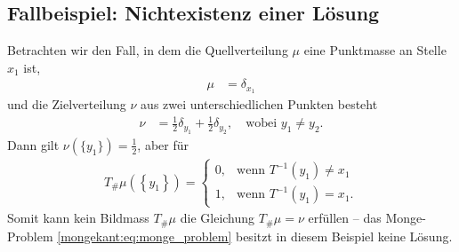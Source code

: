 \subsection{Fallbeispiel: Nichtexistenz einer Lösung%
\label{mongekant:subsection:monge_inexistence}}
Betrachten wir den Fall,
in dem die Quellverteilung $\mu$ eine Punktmasse an Stelle $x_1$ ist,
\begin{align*}
\mu
&=
\delta_{x_1}
\end{align*}
und die Zielverteilung $\nu$ aus zwei unterschiedlichen Punkten besteht
\begin{align*}
\nu
&=
\frac{1}{2} \delta_{y_1} + \frac{1}{2} \delta_{y_2}
,\quad
\text{wobei } y_1 \neq y_2
.
\end{align*}
Dann gilt $\nu(\{y_1\}) = \frac{1}{2}$,
aber für
\begin{align*}
T_{\#}\mu\left(\left\{y_1\right\}\right)
=
\begin{cases}
0,
&\text{wenn }
T^{-1}(y_1)
\neq
x_1
\\
1,
&\text{wenn }
T^{-1}(y_1)
=
x_1
.
\end{cases}
\end{align*}
Somit kann kein Bildmass $T_{\#}\mu$ die Gleichung $T_{\#}\mu=\nu$ erfüllen --
das Monge-Problem \eqref{mongekant:eq:monge_problem}
besitzt in diesem Beispiel keine Lösung.


